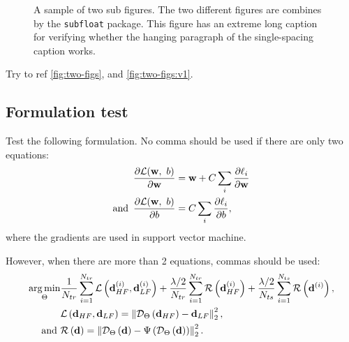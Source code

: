 \begin{figure}[ht]
  \centering
  \caption{A sample of two sub figures. The two different figures are combines by the \texttt{subfloat} package. This figure has an extreme long caption for verifying whether the hanging paragraph of the single-spacing caption works. \label{fig:two-figs}}
\end{figure}

Try to ref \autoref{fig:two-figs}, and \autoref{fig:two-figs:v1}.

\subsection{Formulation test}
Test the following formulation. No comma should be used if there are only two equations:
\begin{subequations}
  \renewcommand{\theequation}
  {\theparentequation-\arabic{equation}}
  \begin{align}
    \frac{\partial \mathcal{L}(\mathbf{w},~b)}{\partial \mathbf{w}} &= \mathbf{w} + C \sum\limits_i\frac{\partial \ell_i}{\partial \mathbf{w}} \label{fml:eq1:partialW}\\
    \mathand~\frac{\partial \mathcal{L}(\mathbf{w},~b)}{\partial b} &= C \sum\limits_i\frac{\partial \ell_i}{\partial b}, \label{fml:eq1:partialb}
  \end{align}
\end{subequations}
where the gradients are used in support vector machine.

However, when there are more than 2 equations, commas should be used:
\begin{equation} \label{fml:ptl:robust}
  \begin{aligned}
    \operatorname*{arg\,min}\limits_{\Theta} & \frac{1}{N_{tr}} \sum_{i=1}^{N_{tr}} \mathcal{L}\left(\mathbf{d}_{HF}^{(i)}, \mathbf{d}_{LF}^{(i)}\right) + \frac{\lambda/2}{N_{tr}} \sum_{i=1}^{N_{tr}} \mathcal{R}\left(\mathbf{d}_{HF}^{(i)}\right) + \frac{\lambda/2}{N_{ts}} \sum_{i=1}^{N_{ts}} \mathcal{R}\left(\mathbf{d}^{(i)}\right), \\
    &\mathcal{L} \left( \mathbf{d}_{HF}, \mathbf{d}_{LF} \right) = \left\lVert \mathcal{D}_{\Theta}\left( \mathbf{d}_{HF} \right) - \mathbf{d}_{LF} \right\rVert^2_2, \\
    \operatorname*{and}~&\mathcal{R} \left( \mathbf{d} \right) = \left\lVert \mathcal{D}_{\Theta}\left( \mathbf{d} \right) - \Psi\left(\mathcal{D}_{\Theta}\left( \mathbf{d} \right)\right) \right\rVert^2_2.
  \end{aligned}
\end{equation}

